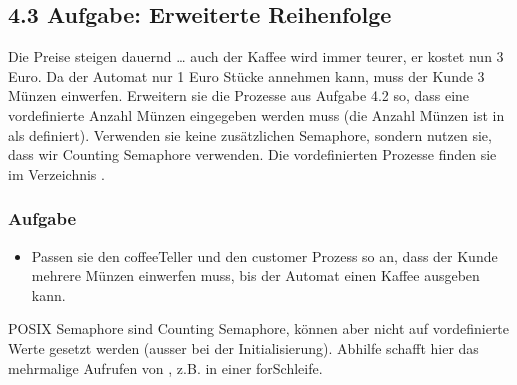 \documentclass[a4paper,10pt,english]{report}
\begin{document}
\subsection{4.3	Aufgabe: Erweiterte Reihenfolge}
\label{\detokenize{P08_Sync/README:aufgabe-erweiterte-reihenfolge}}
\sphinxAtStartPar
Die Preise steigen dauernd … auch der Kaffee wird immer teurer, er kostet nun 3 Euro. Da der Automat nur 1 Euro Stücke annehmen kann, muss der Kunde 3 Münzen einwerfen. Erweitern sie die Prozesse aus Aufgabe 4.2 so, dass eine vordefinierte Anzahl Münzen eingegeben werden muss (die Anzahl Münzen ist in  als  definiert). Verwenden sie keine zusätzlichen Semaphore, sondern nutzen sie, dass wir Counting Semaphore verwenden. Die vordefinierten Prozesse finden sie im Verzeichnis .


\subsubsection{Aufgabe}
\label{\detokenize{P08_Sync/README:aufgabe}}\begin{itemize}
\item {} 
\sphinxAtStartPar
Passen sie den coffeeTeller und den customer Prozess so an, dass der Kunde mehrere Münzen einwerfen muss, bis der Automat einen Kaffee ausgeben kann.

\end{itemize}

\sphinxAtStartPar
{} POSIX Semaphore sind Counting Semaphore, können aber nicht auf vordefinierte Werte gesetzt werden (ausser bei der Initialisierung). Abhilfe schafft hier das mehrmalige Aufrufen von , z.B. in einer for\sphinxhyphen{}Schleife.
\end{document}
